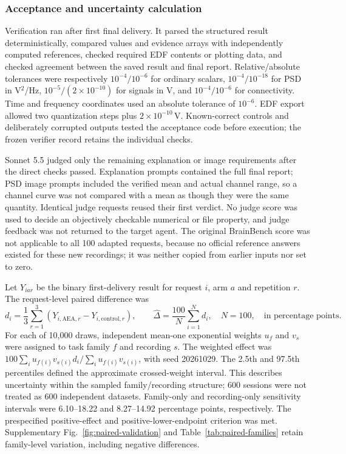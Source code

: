 \subsubsection*{Acceptance and uncertainty calculation}

Verification ran after first final delivery. It parsed the structured result deterministically, compared values and evidence arrays with independently computed references, checked required EDF contents or plotting data, and checked agreement between the saved result and final report. Relative/absolute tolerances were respectively \(10^{-4}/10^{-6}\) for ordinary scalars, \(10^{-4}/10^{-18}\) for PSD in V\(^{2}\)/Hz, \(10^{-5}/(2\times10^{-10})\) for signals in V, and \(10^{-4}/10^{-6}\) for connectivity. Time and frequency coordinates used an absolute tolerance of \(10^{-6}\). EDF export allowed two quantization steps plus \(2\times10^{-10}\)\,V. Known-correct controls and deliberately corrupted outputs tested the acceptance code before execution; the frozen verifier record retains the individual checks.

Sonnet 5.5 judged only the remaining explanation or image requirements after the direct checks passed. Explanation prompts contained the full final report; PSD image prompts included the verified mean and actual channel range, so a channel curve was not compared with a mean as though they were the same quantity. Identical judge requests reused their first verdict. No judge score was used to decide an objectively checkable numerical or file property, and judge feedback was not returned to the target agent. The original BrainBench score was not applicable to all 100 adapted requests, because no official reference answers existed for these new recordings; it was neither copied from earlier inputs nor set to zero.

Let \(Y_{iar}\) be the binary first-delivery result for request \(i\), arm \(a\) and repetition \(r\). The request-level paired difference was
\[
d_i = \frac{1}{3}\sum_{r=1}^{3}\left(Y_{i,\mathrm{AEA},r}-Y_{i,\mathrm{control},r}\right),
\qquad \widehat\Delta=\frac{100}{N}\sum_{i=1}^{N}d_i,\quad N=100,
\quad\text{in percentage points}.
\]
For each of 10,000 draws, independent mean-one exponential weights \(u_f\) and \(v_s\) were assigned to task family \(f\) and recording \(s\). The weighted effect was \(100\sum_i u_{f(i)}v_{s(i)}d_i/\sum_i u_{f(i)}v_{s(i)}\), with seed 20261029. The 2.5th and 97.5th percentiles defined the approximate crossed-weight interval. This describes uncertainty within the sampled family/recording structure; 600 sessions were not treated as 600 independent datasets. Family-only and recording-only sensitivity intervals were 6.10--18.22 and 8.27--14.92 percentage points, respectively. The prespecified positive-effect and positive-lower-endpoint criterion was met. Supplementary Fig.~\ref*{fig:paired-validation} and Table~\ref*{tab:paired-families} retain family-level variation, including negative differences.


